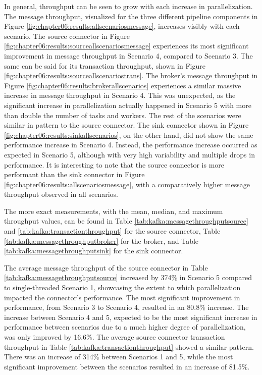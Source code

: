 In general, throughput can be seen to grow with each increase in parallelization. The message throughput, visualized for the three different pipeline components in Figure \ref{fig:chapter06:results:allscenariosmessage}, increases visibly with each scenario. The source connector in Figure \ref{fig:chapter06:results:sourceallscenariosmessage} experiences its most significant improvement in message throughput in Scenario 4, compared to Scenario 3. The same can be said for its transaction throughput, shown in Figure \ref{fig:chapter06:results:sourceallscenariostrans}. The broker's message throughput in Figure \ref{fig:chapter06:results:brokerallscenarios} experiences a similar massive increase in message throughput in Scenario 4. This was unexpected, as the significant increase in parallelization actually happened in Scenario 5 with more than double the number of tasks and workers. The rest of the scenarios were similar in pattern to the source connector. The sink connector shown in Figure \ref{fig:chapter06:results:sinkallscenarios}, on the other hand, did not show the same performance increase in Scenario 4. Instead, the performance increase occurred as expected in Scenario 5, although with very high variability and multiple drops in performance. It is interesting to note that the source connector is more performant than the sink connector in Figure \ref{fig:chapter06:results:allscenariosmessage}, with a comparatively higher message throughput observed in all scenarios.


The more exact measurements, with the mean, median, and maximum throughput values, can be found in Table \ref{tab:kafka:messagethroughputsource} and \ref{tab:kafka:transactionthroughput} for the source connector, Table \ref{tab:kafka:messagethroughputbroker} for the broker, and Table \ref{tab:kafka:messagethroughputsink} for the sink connector.

The average message throughput of the source connector in Table \ref{tab:kafka:messagethroughputsource} increased by 374\% in Scenario 5 compared to single-threaded Scenario 1, showcasing the extent to which parallelization impacted the connector's performance. The most significant improvement in performance, from Scenario 3 to Scenario 4, resulted in an 80.8\% increase. The increase between Scenario 4 and 5, expected to be the most significant increase in performance between scenarios due to a much higher degree of parallelization, was only improved by 16.6\%. The average source connector transaction throughput in Table \ref{tab:kafka:transactionthroughput} showed a similar pattern. There was an increase of 314\% between Scenarios 1 and 5, while the most significant improvement between the scenarios resulted in an increase of 81.5\%.

